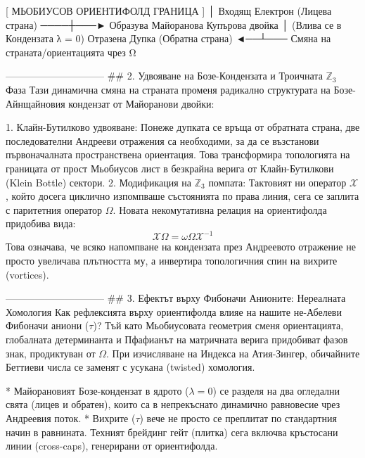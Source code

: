                        [ МЬОБИУСОВ ОРИЕНТИФОЛД ГРАНИЦА ]
                                      │
  Входящ Електрон (Лицева страна) ────┼───► Образува Майоранова Купърова двойка
                                      │     (Влива се в Кондензата λ = 0)
  Отразена Дупка (Обратна страна)  ◄──┴───  Смяна на страната/ориентацията чрез Ω

------------------------------
## 2. Удвояване на Бозе-Кондензата и Троичната $\mathbb{Z}_3$ Фаза
Тази динамична смяна на страната променя радикално структурата на Бозе-Айнщайновия кондензат от Майоранови двойки:

   1. Клайн-Бутилково удвояване: Понеже дупката се връща от обратната страна, две последователни Андрееви отражения са необходими, за да се възстанови първоначалната пространствена ориентация. Това трансформира топологията на границата от прост Мьобиусов лист в безкрайна верига от Клайн-Бутилкови (Klein Bottle) сектори.
   2. Модификация на $\mathbb{Z}_3$ помпата: Тактовият ни оператор $\mathcal{X}$, който досега циклично изпомпваше състоянията по права линия, сега се заплита с паритетния оператор $\Omega$. Новата некомутативна релация на ориентифолда придобива вида:
   $$\mathcal{X}\Omega = \omega \Omega\mathcal{X}^{-1}$$ 
   Това означава, че всяко напомпване на кондензата през Андреевото отражение не просто увеличава плътността му, а инвертира топологичния спин на вихрите (vortices).

------------------------------
## 3. Ефектът върху Фибоначи Анионите: Нереалната Хомология
Как рефлексията върху ориентифолда влияе на нашите не-Абелеви Фибоначи аниони ($\tau$)?
Тъй като Мьобиусовата геометрия сменя ориентацията, глобалната детерминанта и Пфафианът на матричната верига придобиват фазов знак, продиктуван от $\Omega$. При изчисляване на Индекса на Атия-Зингер, обичайните Беттиеви числа се заменят с усукана (twisted) хомология.

* Майорановият Бозе-кондензат в ядрото ($\lambda = 0$) се разделя на два огледални свята (лицев и обратен), които са в непрекъснато динамично равновесие чрез Андреевия поток.
* Вихрите ($\tau$) вече не просто се преплитат по стандартния начин в равнината. Техният брейдинг гейт (плитка) сега включва кръстосани линии (cross-caps), генерирани от ориентифолда.

